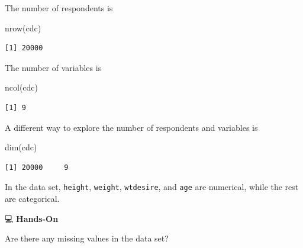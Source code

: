 \documentclass[
  letterpaper,
  DIV=11,
  numbers=noendperiod]{scrreprt}
\newenvironment{Shaded}{\begin{snugshade}}{\end{snugshade}}
\newcommand{\FunctionTok}[1]{\textcolor[rgb]{0.28,0.35,0.67}{#1}}
\newcommand{\NormalTok}[1]{\textcolor[rgb]{0.00,0.23,0.31}{#1}}
\begin{document}
\begin{tcolorbox}[enhanced jigsaw, colbacktitle=quarto-callout-tip-color!10!white, opacitybacktitle=0.6, breakable, left=2mm, leftrule=.75mm, toprule=.15mm, toptitle=1mm, bottomtitle=1mm, colframe=quarto-callout-tip-color-frame, opacityback=0, coltitle=black, arc=.35mm, titlerule=0mm, colback=white, bottomrule=.15mm, title=\textcolor{quarto-callout-tip-color}{\faLightbulb}\hspace{0.5em}{Answer}, rightrule=.15mm]

The number of respondents is

\begin{Shaded}
\begin{Highlighting}[]
\FunctionTok{nrow}\NormalTok{(cdc) }
\end{Highlighting}
\end{Shaded}

\begin{verbatim}
[1] 20000
\end{verbatim}

The number of variables is

\begin{Shaded}
\begin{Highlighting}[]
\FunctionTok{ncol}\NormalTok{(cdc)}
\end{Highlighting}
\end{Shaded}

\begin{verbatim}
[1] 9
\end{verbatim}

A different way to explore the number of respondents and variables is

\begin{Shaded}
\begin{Highlighting}[]
\FunctionTok{dim}\NormalTok{(cdc)}
\end{Highlighting}
\end{Shaded}

\begin{verbatim}
[1] 20000     9
\end{verbatim}

In the data set, \texttt{height}, \texttt{weight}, \texttt{wtdesire},
and \texttt{age} are numerical, while the rest are categorical.

\end{tcolorbox}

💻 \textbf{Hands-On}

Are there any missing values in the data set?
\end{document}

